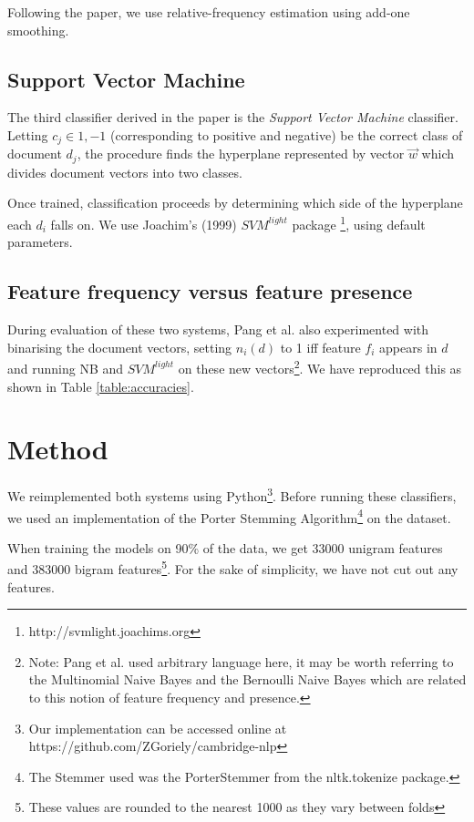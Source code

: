 \documentclass[12pt]{article}
\begin{document}
\begin{multicols}{2}
Following the paper, we use relative-frequency estimation using add-one smoothing.

\subsection{Support Vector Machine}

The third classifier derived in the paper is the \emph{Support Vector Machine} classifier. Letting $c_{j} \in {1, -1}$ (corresponding to positive and negative) be the correct class of document $d_{j}$, the procedure finds the hyperplane represented by vector $\vec{w}$ which divides document vectors into  two classes.

Once trained, classification proceeds by determining which side of the hyperplane each $d_{i}$ falls on. We use Joachim's (1999) $SVM^{light}$ package \footnote{http://svmlight.joachims.org}, using default parameters.

\subsection{Feature frequency versus feature presence}

During evaluation of these two systems, Pang et al. also experimented with binarising the document vectors, setting $n_{i}(d)$ to 1 iff feature $f_{i}$ appears in $d$ and running NB and $SVM^{light}$ on these new vectors\footnote{Note: Pang et al. used arbitrary language here, it may be worth referring to the Multinomial Naive Bayes and the Bernoulli Naive Bayes which are related to this notion of feature frequency and presence.}. We have reproduced this as shown in Table \ref{table:accuracies}.

\section{Method}

We reimplemented both systems using Python\footnote{Our implementation can be accessed online at https://github.com/ZGoriely/cambridge-nlp}. Before running these classifiers, we used an implementation of the Porter Stemming Algorithm\footnote{The Stemmer used was the PorterStemmer from the nltk.tokenize package.} on the dataset.

When training the models on 90\% of the data, we get 33000 unigram features and 383000 bigram features\footnote{These values are rounded to the nearest 1000 as they vary between folds}. For the sake of simplicity, we have not cut out any features.


\end{multicols}
\end{document}
